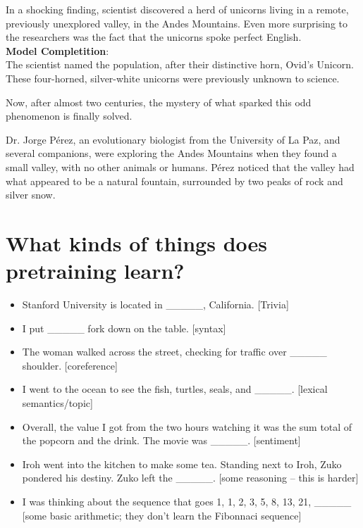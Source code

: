 In a shocking finding, scientist discovered a herd of unicorns living in a remote, previously unexplored valley, in the Andes Mountains. Even more surprising to the researchers was the fact that the unicorns spoke perfect English. \\ 
\textbf{Model Completition}: \\ 

The scientist named the population, after their distinctive horn, Ovid’s Unicorn. These four-horned, silver-white unicorns were previously unknown to science.

Now, after almost two centuries, the mystery of what sparked this odd phenomenon is finally solved.

Dr. Jorge Pérez, an evolutionary biologist from the University of La Paz, and several companions, were exploring the Andes Mountains when they found a small valley, with no other animals or humans. Pérez noticed that the valley had what appeared to be a natural fountain, surrounded by two peaks of rock and silver snow.



\section{What kinds of things does pretraining learn?}

\begin{itemize}
\item Stanford University is located in \_\_\_\_\_, California. [Trivia]
\item I put \_\_\_\_\_ fork down on the table. [syntax]
\item The woman walked across the street, checking for traffic over \_\_\_\_\_ shoulder. [coreference]
 \item I went to the ocean to see the fish, turtles, seals, and \_\_\_\_\_. [lexical semantics/topic]
\item Overall, the value I got from the two hours watching it was the sum total of the popcorn and the drink. The movie was \_\_\_\_\_. [sentiment]
\item Iroh went into the kitchen to make some tea. Standing next to Iroh, Zuko pondered his destiny. Zuko left the \_\_\_\_\_. [some reasoning – this is harder]
\item I was thinking about the sequence that goes 1, 1, 2, 3, 5, 8, 13, 21, \_\_\_\_\_ [some basic arithmetic; they don’t learn the Fibonnaci sequence]
\end{itemize}


